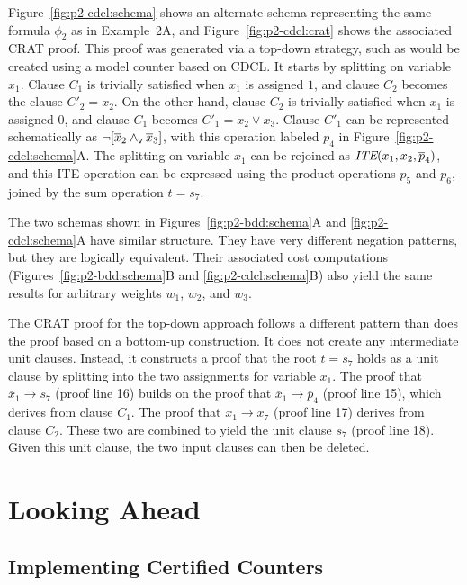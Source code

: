 \documentclass{llncs}
\newcommand{\pand}{\mathbin{\land_{\sf v}}}
\newcommand{\tautology}{1}
\newcommand{\nil}{0}
\newcommand{\obar}[1]{\overline{#1}}
\newcommand{\ite}{\mbox{\it ITE}}
\begin{document}
Figure~\ref{fig:p2-cdcl:schema} shows an alternate schema representing
the same formula $\phi_2$ as in Example~2A, and
Figure~\ref{fig:p2-cdcl:crat} shows the associated CRAT proof.  This
proof was generated via a top-down strategy, such as would be created
using a model counter based on CDCL\@.  It starts by splitting on
variable $x_1$.  Clause $C_1$ is trivially satisfied when $x_1$ is
assigned $\tautology$, and clause $C_2$ becomes the clause $C'_2 =
x_2$.  On the other hand, clause $C_2$ is trivially satisfied when
$x_1$ is assigned $\nil$, and clause $C_1$ becomes $C'_1 = x_2 \lor
x_3$.  Clause $C'_1$ can be represented schematically as
$\neg[\obar{x}_2 \pand \obar{x}_3]$, with this operation labeled $p_4$
in Figure~\ref{fig:p2-cdcl:schema}A\@.  The splitting on variable
$x_1$ can be rejoined as $\ite(x_1, x_2, \obar{p}_4)$, and this ITE
operation can be expressed using the product operations $p_5$ and
$p_6$, joined by the sum operation $t = s_7$.

The two schemas shown in Figures~\ref{fig:p2-bdd:schema}A and
\ref{fig:p2-cdcl:schema}A have similar structure.  They have very
different negation patterns, but they are logically equivalent.  Their
associated cost computations (Figures~\ref{fig:p2-bdd:schema}B and
\ref{fig:p2-cdcl:schema}B) also yield the same results for arbitrary
weights $w_1$, $w_2$, and $w_3$.

The CRAT proof for the top-down approach follows a different pattern than does the proof based on a bottom-up construction.
It does
not create any intermediate unit clauses.  Instead, it constructs a proof
that the root $t = s_7$ holds as a unit clause by splitting into the
two assignments for variable $x_1$.  The proof that
$\obar{x}_1 \rightarrow s_7$ (proof line 16) builds on the proof that
$\obar{x}_1 \rightarrow \obar{p}_4$ (proof line 15), which derives from clause $C_1$.
The proof that $x_1 \rightarrow x_7$ (proof line 17) derives from clause $C_2$.
These two are combined to yield the unit clause $s_7$ (proof line 18).
Given this unit clause, the two input clauses can then be deleted.


\section{Looking Ahead}

\subsection{Implementing Certified Counters}
\end{document}
